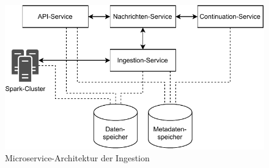 \begin{figure}
    \centering
    \includegraphics{Grafiken/Entwicklung-System-Architektur.pdf}
    \caption{Microservice-Architektur der Ingestion}
    \label{fig:system-architektur}
\end{figure}
